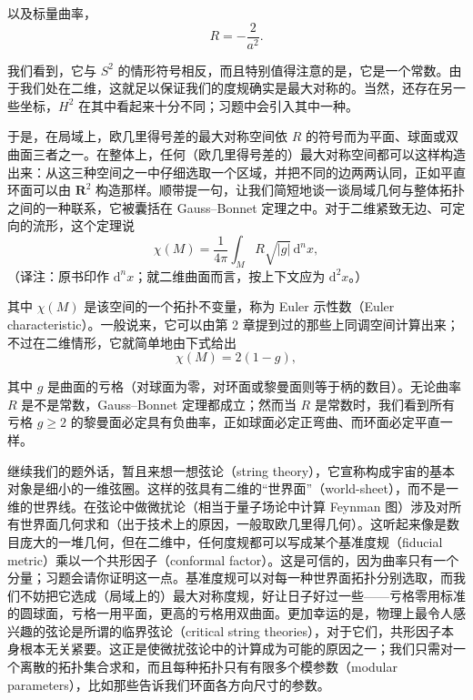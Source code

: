以及标量曲率，
\begin{equation*}
R = -\frac{2}{a^{2}}.
\tag{3.198}
\end{equation*}

我们看到，它与 $S^{2}$ 的情形符号相反，而且特别值得注意的是，它是一个常数。由于我们处在二维，这就足以保证我们的度规确实是最大对称的。当然，还存在另一些坐标，$H^{2}$ 在其中看起来十分不同；习题中会引入其中一种。

于是，在局域上，欧几里得号差的最大对称空间依 $R$ 的符号而为平面、球面或双曲面三者之一。在整体上，任何（欧几里得号差的）最大对称空间都可以这样构造出来：从这三种空间之一中仔细选取一个区域，并把不同的边两两认同，正如平直环面可以由 $\mathbf{R}^{2}$ 构造那样。顺带提一句，让我们简短地谈一谈局域几何与整体拓扑之间的一种联系，它被囊括在 Gauss–Bonnet 定理之中。对于二维紧致无边、可定向的流形，这个定理说
\begin{equation*}
\chi(M) = \frac{1}{4\pi}\int_{M} R\sqrt{|g|}\,\mathrm{d}^{n}x,
\tag{3.199}
\end{equation*}
（译注：原书印作 $\mathrm{d}^{n}x$；就二维曲面而言，按上下文应为 $\mathrm{d}^{2}x$。）

其中 $\chi(M)$ 是该空间的一个拓扑不变量，称为 Euler 示性数（Euler characteristic）。一般说来，它可以由第 2 章提到过的那些上同调空间计算出来；不过在二维情形，它就简单地由下式给出
\begin{equation*}
\chi(M) = 2(1 - g),
\tag{3.200}
\end{equation*}

其中 $g$ 是曲面的亏格（对球面为零，对环面或黎曼面则等于柄的数目）。无论曲率 $R$ 是不是常数，Gauss–Bonnet 定理都成立；然而当 $R$ 是常数时，我们看到所有亏格 $g \geq 2$ 的黎曼面必定具有负曲率，正如球面必定正弯曲、而环面必定平直一样。

继续我们的题外话，暂且来想一想弦论（string theory），它宣称构成宇宙的基本对象是细小的一维弦圈。这样的弦具有二维的“世界面”（world-sheet），而不是一维的世界线。在弦论中做微扰论（相当于量子场论中计算 Feynman 图）涉及对所有世界面几何求和（出于技术上的原因，一般取欧几里得几何）。这听起来像是数目庞大的一堆几何，但在二维中，任何度规都可以写成某个基准度规（fiducial metric）乘以一个共形因子（conformal factor）。这是可信的，因为曲率只有一个分量；习题会请你证明这一点。基准度规可以对每一种世界面拓扑分别选取，而我们不妨把它选成（局域上的）最大对称度规，好让日子好过一些——亏格零用标准的圆球面，亏格一用平面，更高的亏格用双曲面。更加幸运的是，物理上最令人感兴趣的弦论是所谓的临界弦论（critical string theories），对于它们，共形因子本身根本无关紧要。这正是使微扰弦论中的计算成为可能的原因之一；我们只需对一个离散的拓扑集合求和，而且每种拓扑只有有限多个模参数（modular parameters），比如那些告诉我们环面各方向尺寸的参数。

